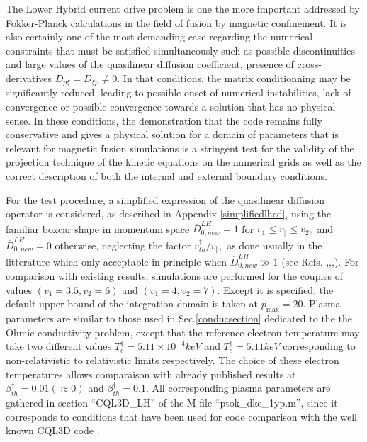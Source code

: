 
\label{lhcdsection} The Lower Hybrid current drive problem is one
the more important addressed by Fokker-Planck calculations in the
field of fusion by magnetic confinement. It is also certainly one of
the most demanding case regarding the numerical constraints that
must be satisfied simultaneously such as possible discontinuities
and large values of the quasilinear diffusion coefficient, presence
of cross-derivatives $D_{p\xi }=D_{\xi p}\neq 0.$ In that
conditions, the matrix conditionning may be significantly reduced,
leading to possible onset of numerical instabilities, lack of
convergence or possible convergence towards a solution that has no
physical sense. In these conditions, the demonstration that the code
remains fully conservative and gives a physical solution for a
domain of parameters that is relevant for magnetic fusion
simulations is a stringent test for the validity of the projection
technique of the kinetic equations on the numerical grids as well as
the correct description of both the internal and external boundary
conditions.

For the test procedure, a simplified expression of the quasilinear diffusion
operator is considered, as described in Appendix \ref{simplifiedlhcd}, using
the familiar boxcar shape in momentum space $\overline{D}_{0,new}^{LH}=1$
for $v_{1}\leq v_{\Vert }\leq v_{2},$ and $\overline{D}_{0,new}^{LH}=0$
otherwise, neglecting the factor $v_{th}^{\dag }/v_{\Vert },$ as done
usually in the litterature which only acceptable in principle when $%
\overline{D}_{0,new}^{LH}\gg 1$ (see Refs. \cite{kar85},\cite{kar86},\cite
{sho94},\cite{pey98}). For comparison with existing results, simulations are
performed for the couples of values $\left( v_{1}=3.5,v_{2}=6\right) $ and $%
\left( v_{1}=4,v_{2}=7\right) .$ Except it is specified, the default upper
bound of the integration domain is taken at $p_{\max }=20$. Plasma
parameters are similar to those used in Sec.\ref{conducsection} dedicated to
the the Ohmic conductivity problem, except that the reference electron
temperature may take two different values $T_{e}^{\dagger }=5.11\times
10^{-4}keV$ and $T_{e}^{\dagger }=5.11keV$ corresponding to non-relativistic
to relativistic limits respectively. The choice of these electron
temperatures allows comparaison with already published results at $\beta
_{th}^{\dag }=0.01\left( \approx 0\right) $ and $\beta _{th}^{\dag }=0.1$.
All corresponding plasma parameters are gathered in section ``CQL3D\_LH'' of the
M-file ``ptok\_dke\_1yp.m'', since it corresponds to conditions that have been used for code comparison with the
well known CQL3D code \cite{har93c1_IAEA}.

